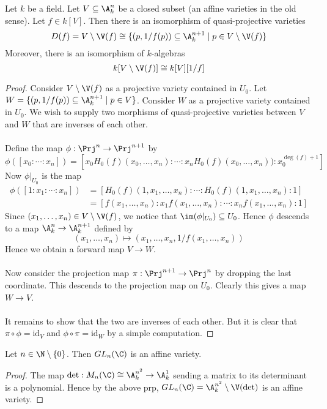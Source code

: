 \documentclass[a4paper]{article}
\begin{document}
\begin{prp}{}{} Let $k$ be a field. Let $V\subseteq\A_k^n$ be a closed subset (an affine varieties in the old sense). Let $f\in k[V]$. Then there is an isomorphism of quasi-projective varieties $$D(f)=V\setminus\V(f)\cong\{(p,1/f(p))\subseteq\A_k^{n+1}\;|\;p\in V\setminus\V(f)\}$$ Moreover, there is an isomorphism of $k$-algebras $$k[V\setminus\V(f)]\cong k[V][1/f]$$ \tcbline
\begin{proof}
Consider $V\setminus\V(f)$ as a projective variety contained in $U_0$. Let $W=\{(p,1/f(p))\subseteq\A_k^{n+1}\;|\;p\in V\}$. Consider $W$ as a projective variety contained in $U_0$. We wish to supply two morphisms of quasi-projective varieties between $V$ and $W$ that are inverses of each other. \\~\\

Define the map $\phi:\Prj^n\to\Prj^{n+1}$ by $$\phi([x_0:\cdots:x_n])=\left[x_0H_0(f)(x_0,\dots,x_n):\cdots:x_nH_0(f)(x_0,\dots,x_n)):x_0^{\deg(f)+1}\right]$$ Now $\phi|_{U_0}$ is the map 
\begin{align*}
\phi([1:x_1:\cdots:x_n])&=\left[H_0(f)(1,x_1,\dots,x_n):\cdots:H_0(f)(1,x_1,\dots,x_n):1\right]\\
&=[f(x_1,\dots,x_n):x_1f(x_1,\dots,x_n):\cdots:x_nf(x_1,\dots,x_n):1]
\end{align*}
Since $(x_1,\dots,x_n)\in V\setminus\V(f)$, we notice that $\im(\phi|_{U_0})\subseteq U_0$. Hence $\phi$ descends to a map $\A_k^n\to\A_k^{n+1}$ defined by $$(x_1,\dots,x_n)\mapsto(x_1,\dots,x_n,1/f(x_1,\dots,x_n))$$ Hence we obtain a forward map $V\to W$. \\~\\

Now consider the projection map $\pi:\Prj^{n+1}\to\Prj^n$ by dropping the last coordinate. This descends to the projection map on $U_0$. Clearly this gives a map $W\to V$. \\~\\

It remains to show that the two are inverses of each other. But it is clear that $\pi\circ\phi=\text{id}_V$ and $\phi\circ\pi=\text{id}_W$ by a simple computation. 
\end{proof}
\end{prp}

\begin{eg}{}{} Let $n\in\N\setminus\{0\}$. Then $GL_n(\C)$ is an affine variety. \tcbline
\begin{proof}
The map $\det:M_n(\C)\cong\A_k^{n^2}\to\A_k^1$ sending a matrix to its determinant is a polynomial. Hence by the above prp, $GL_n(\C)=\A_k^{n^2}\setminus\V(\det)$ is an affine variety. 
\end{proof}
\end{eg}
\end{document}
